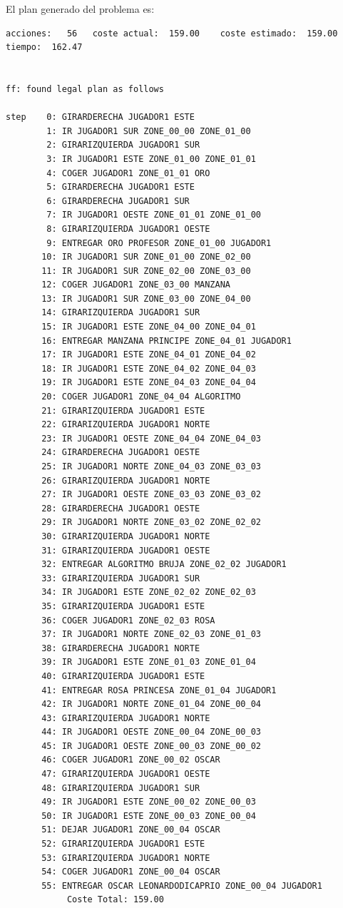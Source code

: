 \documentclass[12pt]{article}
\begin{document}
El plan generado del problema es:
\begin{verbatim}
acciones:   56   coste actual:  159.00    coste estimado:  159.00    tiempo:  162.47


ff: found legal plan as follows

step    0: GIRARDERECHA JUGADOR1 ESTE
        1: IR JUGADOR1 SUR ZONE_00_00 ZONE_01_00
        2: GIRARIZQUIERDA JUGADOR1 SUR
        3: IR JUGADOR1 ESTE ZONE_01_00 ZONE_01_01
        4: COGER JUGADOR1 ZONE_01_01 ORO
        5: GIRARDERECHA JUGADOR1 ESTE
        6: GIRARDERECHA JUGADOR1 SUR
        7: IR JUGADOR1 OESTE ZONE_01_01 ZONE_01_00
        8: GIRARIZQUIERDA JUGADOR1 OESTE
        9: ENTREGAR ORO PROFESOR ZONE_01_00 JUGADOR1
       10: IR JUGADOR1 SUR ZONE_01_00 ZONE_02_00
       11: IR JUGADOR1 SUR ZONE_02_00 ZONE_03_00
       12: COGER JUGADOR1 ZONE_03_00 MANZANA
       13: IR JUGADOR1 SUR ZONE_03_00 ZONE_04_00
       14: GIRARIZQUIERDA JUGADOR1 SUR
       15: IR JUGADOR1 ESTE ZONE_04_00 ZONE_04_01
       16: ENTREGAR MANZANA PRINCIPE ZONE_04_01 JUGADOR1
       17: IR JUGADOR1 ESTE ZONE_04_01 ZONE_04_02
       18: IR JUGADOR1 ESTE ZONE_04_02 ZONE_04_03
       19: IR JUGADOR1 ESTE ZONE_04_03 ZONE_04_04
       20: COGER JUGADOR1 ZONE_04_04 ALGORITMO
       21: GIRARIZQUIERDA JUGADOR1 ESTE
       22: GIRARIZQUIERDA JUGADOR1 NORTE
       23: IR JUGADOR1 OESTE ZONE_04_04 ZONE_04_03
       24: GIRARDERECHA JUGADOR1 OESTE
       25: IR JUGADOR1 NORTE ZONE_04_03 ZONE_03_03
       26: GIRARIZQUIERDA JUGADOR1 NORTE
       27: IR JUGADOR1 OESTE ZONE_03_03 ZONE_03_02
       28: GIRARDERECHA JUGADOR1 OESTE
       29: IR JUGADOR1 NORTE ZONE_03_02 ZONE_02_02
       30: GIRARIZQUIERDA JUGADOR1 NORTE
       31: GIRARIZQUIERDA JUGADOR1 OESTE
       32: ENTREGAR ALGORITMO BRUJA ZONE_02_02 JUGADOR1
       33: GIRARIZQUIERDA JUGADOR1 SUR
       34: IR JUGADOR1 ESTE ZONE_02_02 ZONE_02_03
       35: GIRARIZQUIERDA JUGADOR1 ESTE
       36: COGER JUGADOR1 ZONE_02_03 ROSA
       37: IR JUGADOR1 NORTE ZONE_02_03 ZONE_01_03
       38: GIRARDERECHA JUGADOR1 NORTE
       39: IR JUGADOR1 ESTE ZONE_01_03 ZONE_01_04
       40: GIRARIZQUIERDA JUGADOR1 ESTE
       41: ENTREGAR ROSA PRINCESA ZONE_01_04 JUGADOR1
       42: IR JUGADOR1 NORTE ZONE_01_04 ZONE_00_04
       43: GIRARIZQUIERDA JUGADOR1 NORTE
       44: IR JUGADOR1 OESTE ZONE_00_04 ZONE_00_03
       45: IR JUGADOR1 OESTE ZONE_00_03 ZONE_00_02
       46: COGER JUGADOR1 ZONE_00_02 OSCAR
       47: GIRARIZQUIERDA JUGADOR1 OESTE
       48: GIRARIZQUIERDA JUGADOR1 SUR
       49: IR JUGADOR1 ESTE ZONE_00_02 ZONE_00_03
       50: IR JUGADOR1 ESTE ZONE_00_03 ZONE_00_04
       51: DEJAR JUGADOR1 ZONE_00_04 OSCAR
       52: GIRARIZQUIERDA JUGADOR1 ESTE
       53: GIRARIZQUIERDA JUGADOR1 NORTE
       54: COGER JUGADOR1 ZONE_00_04 OSCAR
       55: ENTREGAR OSCAR LEONARDODICAPRIO ZONE_00_04 JUGADOR1
     		Coste Total: 159.00

\end{verbatim}
\end{document}

